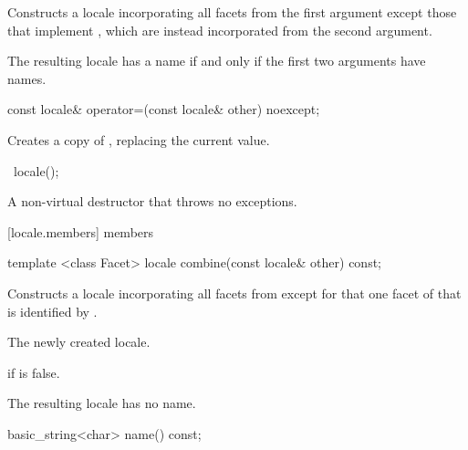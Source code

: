 \begin{itemdescr}
\pnum
\effects
Constructs a locale incorporating all facets from the first argument
except those that implement
,
which are instead incorporated from the second argument.

\pnum
\remarks
The resulting locale has a name if and only if the first two arguments
have names.
\end{itemdescr}

%
\begin{itemdecl}
const locale& operator=(const locale& other) noexcept;
\end{itemdecl}

\begin{itemdescr}
\pnum
\effects
Creates a copy of , replacing the current value.

\pnum
\returns
{}
\end{itemdescr}

%
\begin{itemdecl}
~locale();
\end{itemdecl}

\begin{itemdescr}
\pnum
A non-virtual destructor that throws no exceptions.
\end{itemdescr}

[locale.members]{ members}

%
\begin{itemdecl}
template <class Facet> locale combine(const locale& other) const;
\end{itemdecl}

\begin{itemdescr}
\pnum
\effects
Constructs a locale incorporating
all facets from
except for that one facet of
that is identified by
.

\pnum
\returns
The newly created locale.

\pnum
\throws
{}
if
is false.

\pnum
\remarks
The resulting locale has no name.
\end{itemdescr}

%
\begin{itemdecl}
basic_string<char> name() const;
\end{itemdecl}

